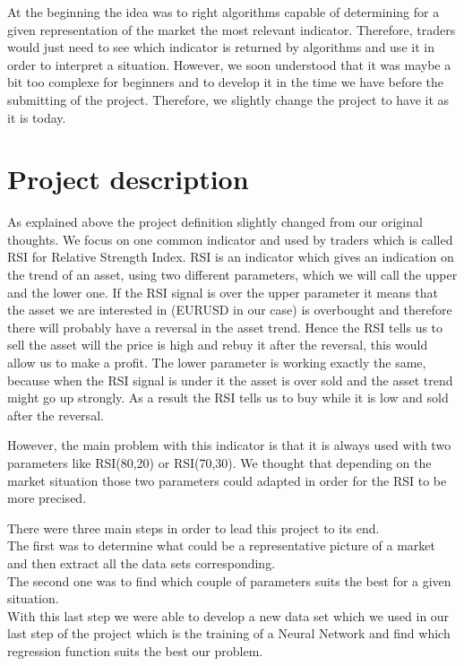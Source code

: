 \documentclass[]{article}
\begin{document}
\vskip 0.5cm 
At the beginning the idea was to right algorithms capable of determining for a given representation of the market the most relevant indicator. Therefore, traders would just need to see which indicator is returned by algorithms and use it in order to interpret a situation. However, we soon understood that it was maybe a bit too complexe for beginners and to develop it in the time we have before the submitting of the project.
Therefore, we slightly change the project to have it as it is today.

\section{Project description}

\vskip 0.5cm
As explained above the project definition slightly changed from our original thoughts. We focus on one common indicator and used by traders which is called RSI for Relative Strength Index. RSI is an indicator which gives an indication on the trend of an asset, using two different parameters, which we will call the upper and the lower one. If the RSI signal is over the upper parameter it means that the asset we are interested in (EURUSD in our case) is overbought and therefore there will probably have a reversal in the asset trend. Hence the RSI tells us to sell the asset will the price is high and rebuy it after the reversal, this would allow us to make a profit. The lower parameter is working exactly the same, because when the RSI signal is under it the asset is over sold and the asset trend might go up strongly. As a result the RSI tells us to buy while it is low and sold after the reversal.

\vskip 0.5cm
However, the main problem with this indicator is that it is always used with two parameters like RSI(80,20) or RSI(70,30). We thought that depending on the market situation those two parameters could adapted in order for the RSI to be more precised. 

\vskip 0.5cm
There were three main steps in order to lead this project to its end.\\
The first was to determine what could be a representative picture of a market and then extract all the data sets corresponding.\\
The second one was to find which couple of parameters suits the best for a given situation.\\
With this last step we were able to develop a new data set which we used in our last step of the project which is the training of a Neural Network and find which regression function suits the best our problem.  
\end{document}
